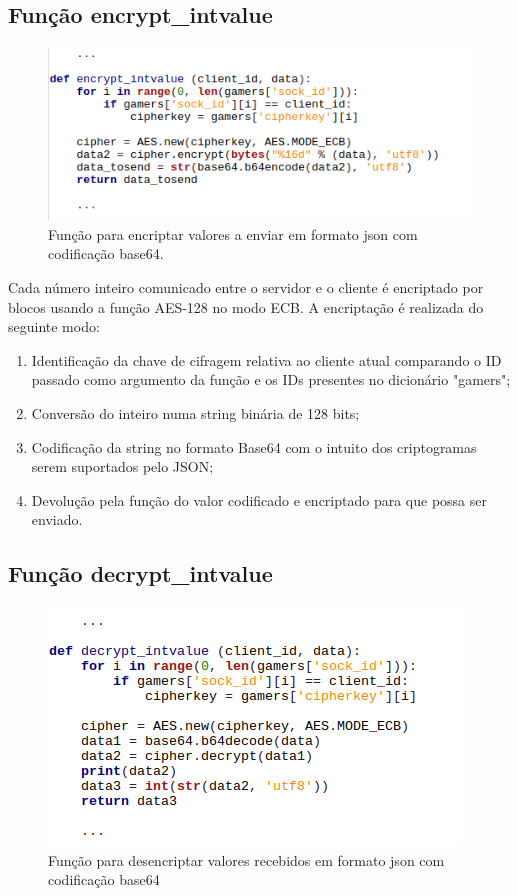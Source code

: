 \documentclass{report}
\begin{document}
\subsection{Função \textbf{encrypt\_intvalue}}
\begin{figure}[H]
	\centering
	\includegraphics[scale=0.65]{encrypt_intvalue}	
	\caption{Função para encriptar valores a enviar em formato json com codificação base64.}
\end{figure}

Cada número inteiro comunicado entre o servidor e o cliente é encriptado por blocos usando a função AES-128 no modo ECB. A encriptação é realizada do seguinte modo: 
\begin{enumerate}
\item Identificação da chave de cifragem relativa ao cliente atual comparando o ID passado como argumento da função e os IDs presentes no dicionário "gamers";
\item Conversão do inteiro numa string binária de 128 bits;
\item Codificação da string no formato Base64 com o intuito dos criptogramas serem suportados pelo JSON;
\item Devolução pela função do valor codificado e encriptado para que possa ser enviado. 
\end{enumerate}

\subsection{Função \textbf{decrypt\_intvalue}}
\begin{figure}[H]
	\centering
	\includegraphics[scale=0.65]{decrypt_intvalue}	
	\caption{Função para desencriptar valores recebidos em formato json com codificação base64}
\end{figure}
\end{document}
